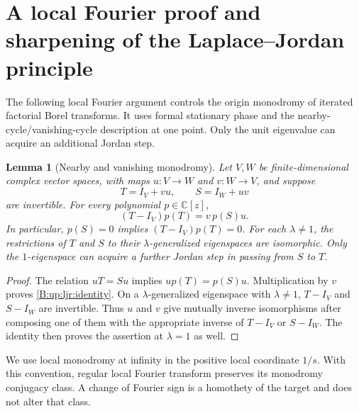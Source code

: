 \documentclass[11pt,a4paper]{article}
\newtheorem{lemma}[theorem]{Lemma}
\theoremstyle{definition}
\theoremstyle{remark}
\numberwithin{equation}{section}
\begin{document}
\section{A local Fourier proof and sharpening of the Laplace--Jordan principle}
\label{B:up:ljr:sec}

The following local Fourier argument controls the origin monodromy of
iterated factorial Borel transforms.  It uses formal stationary phase and
the nearby-cycle/vanishing-cycle description at one point.  Only the unit
eigenvalue can acquire an additional Jordan step.

\begin{lemma}[Nearby and vanishing monodromy]\label{B:up:ljr:quiver}
Let $V,W$ be finite-dimensional complex vector spaces, with maps
$u:V\to W$ and $v:W\to V$, and suppose
\[
                 T=I_V+vu,\qquad S=I_W+uv
\]
are invertible. For every polynomial $p\in\mathbb C[z]$,
\begin{equation}\label{B:up:ljr:identity}
                    (T-I_V)p(T)=v\,p(S)u.
\end{equation}
In particular, $p(S)=0$ implies $(T-I_V)p(T)=0$.
For each $\lambda\ne1$, the restrictions of $T$ and $S$ to their
$\lambda$-generalized eigenspaces are isomorphic.  Only the
$1$-eigenspace can acquire a further Jordan step in passing from $S$ to $T$.
\end{lemma}
\begin{proof}
The relation $uT=Su$ implies $up(T)=p(S)u$. Multiplication by
$v$ proves \eqref{B:up:ljr:identity}.  On a $\lambda$-generalized
eigenspace with $\lambda\ne1$, $T-I_V$ and $S-I_W$ are invertible.
Thus $u$ and $v$ give mutually inverse isomorphisms after composing
one of them with the appropriate inverse of $T-I_V$ or $S-I_W$.
The identity then proves the assertion at $\lambda=1$ as well.
\end{proof}

We use local monodromy at infinity in the positive local coordinate
$1/s$. With this convention, regular local Fourier transform preserves
its monodromy conjugacy class. A change of Fourier sign is a homothety
of the target and does not alter that class.
\end{document}

